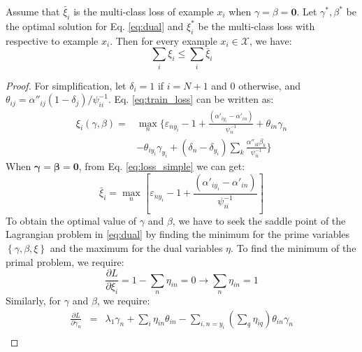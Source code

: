 \begin{theorem}\label{th:1}
Assume that $\bar \xi_i$ is the multi-class loss of example $x_i$ when $\gamma=\beta = \mathbf{0}$. Let $\gamma^*, \beta^*$ be the optimal solution for Eq. \eqref{eq:dual} and $\xi_i^*$ be the multi-class loss with respective to example $x_i$. Then for every example $x_i \in \mathcal{X}$, we have:\[\sum\limits_i {{\xi _i}}  \le \sum\limits_i {{{\bar \xi }_i}} \]
\end{theorem}
\begin{proof}
For simplification, let $\delta_i=1$ if $i=N+1$ and 0 otherwise, and  ${\theta _{ij}} = {\alpha ''_{ij}}\left( {1 - {\delta _j}} \right)/\psi_{ii}^{ - 1}$. Eq. \eqref{eq:train_loss} can be written as:
\begin{equation}\label{eq:loss_simple}
\begin{split}
{\xi _i}(\gamma ,\beta )=&\mathop {\max }\limits_{n} \bigg \{ {\varepsilon _{n{y_i}}} - 1 + \frac{{\left( {{{\alpha '}_{i{y_i}}} - {{\alpha '}_{in}}} \right)}}{{\psi _{ii}^{ - 1}}} + {\theta _{in}}{\gamma _n} \\
&- {\theta _{i{y_i}}}{\gamma _{{y_i}}} + \left( {{\delta _n} - {\delta _{{y_i}}}} \right)\sum\limits_k {\frac{{{{\alpha ''}_{ik}}{\beta _k}}}{{\psi_{ii}^{ - 1}}}}  \bigg\}
\end{split}
\end{equation}
When $\mathbf{\gamma}=\mathbf{\beta} = \mathbf{0}$, from Eq. \eqref{eq:loss_simple} we can get:
\begin{equation*}
{\bar \xi _i} = \mathop {\max }\limits_n \left[ { {\varepsilon _{n{y_i}}}-1 + \frac{{\left( {{{\alpha '}_{i{y_i}}} - {{\alpha '}_{in}}} \right)}}{{\psi _{ii}^{ - 1}}}} \right]
\end{equation*}
To obtain the optimal value of $\gamma$ and $\beta$, we have to seek the saddle point of the Lagrangian problem in \eqref{eq:dual} by finding the minimum for the prime variables $\left\{ \gamma, \beta, \xi \right\}$ and the maximum for the dual variables $\eta $. To find the minimum of the primal problem, we require:
\begin{equation*}
\frac{{\partial L}}{{\partial {\xi _i}}} = 1 - \sum\limits_n {{\eta _{in}}}  = 0 \to \sum\limits_n {{\eta _{in}}}  = 1
\end{equation*}   
Similarly, for $\gamma$ and $\beta$, we require:
\begin{eqnarray}\label{eq:opt_gama}
\frac{{\partial L}}{{\partial {\gamma _n}}} &=& {\lambda _1}{\gamma _n} + \sum\limits_i {{\eta _{in}}{\theta _{in}}}  - \sum\limits_{i,n = {y_i}} {\left( {\sum\limits_q {{\eta _{iq}}} } \right){\theta _{in}}{\gamma _n}}  \nonumber\\

\end{eqnarray}
\end{proof}
